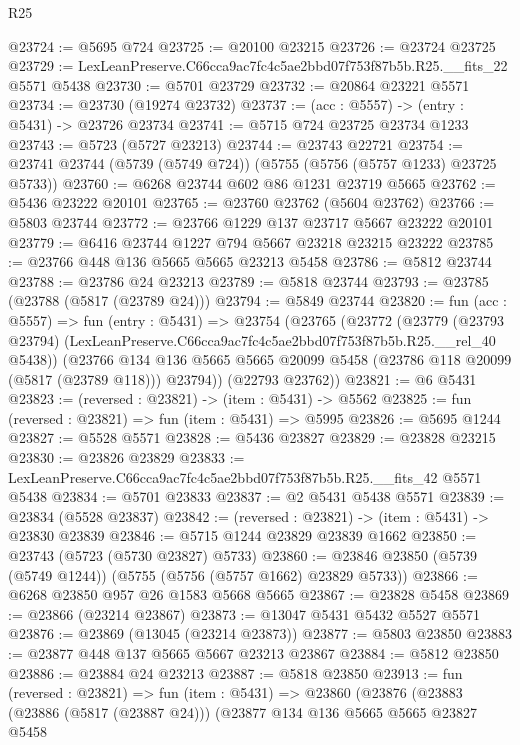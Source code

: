 \begin{lexlean}{R25}
\begin{coremodule}
@23724 := @5695 @724
@23725 := @20100 @23215
@23726 := @23724 @23725
@23729 := LexLeanPreserve.C66cca9ac7fc4c5ae2bbd07f753f87b5b.R25.__fits_22 @5571 @5438
@23730 := @5701 @23729
@23732 := @20864 @23221 @5571
@23734 := @23730 (@19274 @23732)
@23737 := (acc : @5557) -> (entry : @5431) -> @23726 @23734
@23741 := @5715 @724 @23725 @23734 @1233
@23743 := @5723 (@5727 @23213)
@23744 := @23743 @22721
@23754 := @23741 @23744 (@5739 (@5749 @724)) (@5755 (@5756 (@5757 @1233) @23725 @5733))
@23760 := @6268 @23744 @602 @86 @1231 @23719 @5665
@23762 := @5436 @23222 @20101
@23765 := @23760 @23762 (@5604 @23762)
@23766 := @5803 @23744
@23772 := @23766 @1229 @137 @23717 @5667 @23222 @20101
@23779 := @6416 @23744 @1227 @794 @5667 @23218 @23215 @23222
@23785 := @23766 @448 @136 @5665 @5665 @23213 @5458
@23786 := @5812 @23744
@23788 := @23786 @24 @23213
@23789 := @5818 @23744
@23793 := @23785 (@23788 (@5817 (@23789 @24)))
@23794 := @5849 @23744
@23820 := fun (acc : @5557) =>
  fun (entry : @5431) =>
  @23754
    (@23765
      (@23772
        (@23779
          (@23793 @23794)
          (LexLeanPreserve.C66cca9ac7fc4c5ae2bbd07f753f87b5b.R25.__rel_40 @5438))
        (@23766
          @134
          @136
          @5665
          @5665
          @20099
          @5458
          (@23786 @118 @20099 (@5817 (@23789 @118)))
          @23794))
      (@22793 @23762))
@23821 := @6 @5431
@23823 := (reversed : @23821) -> (item : @5431) -> @5562
@23825 := fun (reversed : @23821) => fun (item : @5431) => @5995
@23826 := @5695 @1244
@23827 := @5528 @5571
@23828 := @5436 @23827
@23829 := @23828 @23215
@23830 := @23826 @23829
@23833 := LexLeanPreserve.C66cca9ac7fc4c5ae2bbd07f753f87b5b.R25.__fits_42 @5571 @5438
@23834 := @5701 @23833
@23837 := @2 @5431 @5438 @5571
@23839 := @23834 (@5528 @23837)
@23842 := (reversed : @23821) -> (item : @5431) -> @23830 @23839
@23846 := @5715 @1244 @23829 @23839 @1662
@23850 := @23743 (@5723 (@5730 @23827) @5733)
@23860 := @23846 @23850 (@5739 (@5749 @1244)) (@5755 (@5756 (@5757 @1662) @23829 @5733))
@23866 := @6268 @23850 @957 @26 @1583 @5668 @5665
@23867 := @23828 @5458
@23869 := @23866 (@23214 @23867)
@23873 := @13047 @5431 @5432 @5527 @5571
@23876 := @23869 (@13045 (@23214 @23873))
@23877 := @5803 @23850
@23883 := @23877 @448 @137 @5665 @5667 @23213 @23867
@23884 := @5812 @23850
@23886 := @23884 @24 @23213
@23887 := @5818 @23850
@23913 := fun (reversed : @23821) =>
  fun (item : @5431) =>
  @23860
    (@23876
      (@23883
        (@23886 (@5817 (@23887 @24)))
        (@23877
          @134
          @136
          @5665
          @5665
          @23827
          @5458

\end{coremodule}
\end{lexlean}
